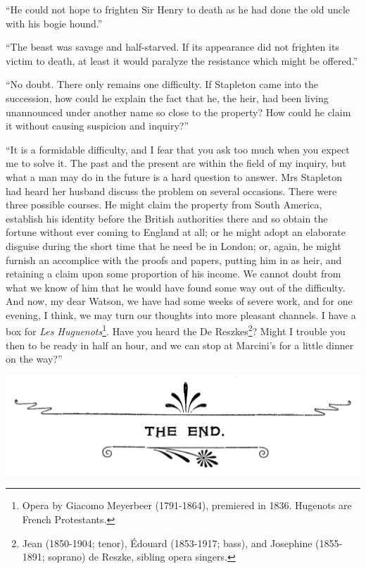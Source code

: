 \documentclass[paper=5.5in:8.5in,BCOR=7mm,twoside,DIV=calc,12pt,usegeometry,openany,chapterprefix,endperiod,headings=big]{scrbook} %
\begin{document}
\enquote{He could not hope to frighten Sir Henry to death as he had done the old uncle with his bogie hound.}

\enquote{The beast was savage and half-starved. If its appearance did not frighten its victim to death, at least it would paralyze the resistance which might be offered.}

\enquote{No doubt. There only remains one difficulty. If Stapleton came into the succession, how could he explain the fact that he, the heir, had been living unannounced under another name so close to the property? How could he claim it without causing suspicion and inquiry?}

\enquote{It is a formidable difficulty, and I fear that you ask too much when you expect me to solve it. The past and the present are within the field of my inquiry, but what a man may do in the future is a hard question to answer. Mrs Stapleton had heard her husband discuss the problem on several occasions. There were three possible courses. He might claim the property from South America, establish his identity before the British authorities there and so obtain the fortune without ever coming to England at all; or he might adopt an elaborate disguise during the short time that he need be in London; or, again, he might furnish an accomplice with the proofs and papers, putting him in as heir, and retaining a claim upon some proportion of his income. We cannot doubt from what we know of him that he would have found some way out of the difficulty. And now, my dear Watson, we have had some weeks of severe work, and for one evening, I think, we may turn our thoughts into more pleasant channels. I have a box for \textit{Les Huguenots}\footnote{Opera by Giacomo Meyerbeer (1791-1864), premiered in 1836. Hugenots are French Protestants.}. Have you heard the De Reszkes\footnote{Jean (1850-1904; tenor), Édouard (1853-1917; bass), and Josephine (1855-1891; soprano) de Reszke, sibling opera singers.}? Might I trouble you then to be ready in half an hour, and we can stop at Marcini's for a little dinner on the way?}

\centering
\includegraphics[width=0.9\linewidth]{theend}
\end{document}

